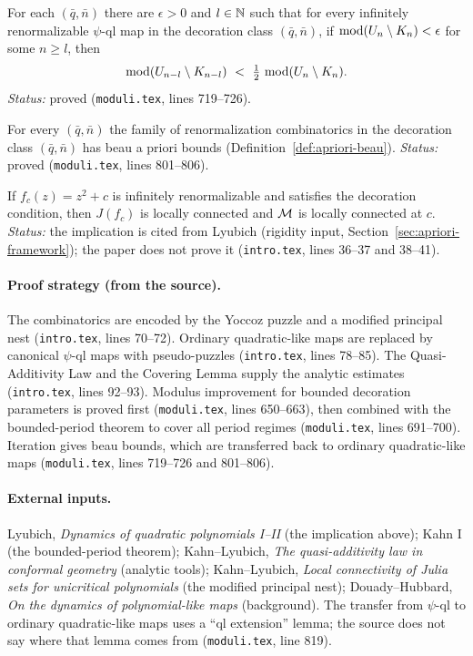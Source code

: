 \begin{theorem}
\label{thm:kahn-II-decay}
For each $(\bar q,\bar n)$ there are $\epsilon>0$ and $l\in\mathbb N$ such that for every
infinitely renormalizable $\psi$-ql map in the decoration class $(\bar q,\bar n)$, if
$\operatorname{mod}(U_n\setminus K_n)<\epsilon$ for some $n\ge l$, then
\[
\modulus(U_{n-l}\setminus K_{n-l})\ <\ \tfrac12\,\modulus(U_n\setminus K_n).
\]
\emph{Status:} proved (\texttt{moduli.tex}, lines 719--726).
\end{theorem}

\begin{theorem}
\label{thm:kahn-II-beau}
For every $(\bar q,\bar n)$ the family of renormalization combinatorics in the decoration class
$(\bar q,\bar n)$ has beau a priori bounds (Definition~\ref{def:apriori-beau}).
\emph{Status:} proved (\texttt{moduli.tex}, lines 801--806).
\end{theorem}

\begin{theorem}
\label{thm:kahn-II-mlc}
If $f_c(z)=z^2+c$ is infinitely renormalizable and satisfies the decoration condition, then
$J(f_c)$ is locally connected and $\mathcal M$ is locally connected at $c$.
\emph{Status:} the implication is cited from Lyubich (rigidity input,
Section~\ref{sec:apriori-framework}); the paper does not prove it
(\texttt{intro.tex}, lines 36--37 and 38--41).
\end{theorem}

\paragraph{Proof strategy (from the source).}
The combinatorics are encoded by the Yoccoz puzzle and a modified principal nest
(\texttt{intro.tex}, lines 70--72).  Ordinary quadratic-like maps are replaced by canonical
$\psi$-ql maps with pseudo-puzzles (\texttt{intro.tex}, lines 78--85).  The Quasi-Additivity Law
and the Covering Lemma supply the analytic estimates (\texttt{intro.tex}, lines 92--93).
Modulus improvement for bounded decoration parameters is proved first
(\texttt{moduli.tex}, lines 650--663), then combined with the bounded-period theorem to cover all
period regimes (\texttt{moduli.tex}, lines 691--700).  Iteration gives beau bounds, which are
transferred back to ordinary quadratic-like maps (\texttt{moduli.tex}, lines 719--726 and 801--806).

\paragraph{External inputs.}
Lyubich, \emph{Dynamics of quadratic polynomials I--II} (the implication above); Kahn I (the
bounded-period theorem); Kahn--Lyubich, \emph{The quasi-additivity law in conformal geometry}
(analytic tools); Kahn--Lyubich, \emph{Local connectivity of Julia sets for unicritical
polynomials} (the modified principal nest); Douady--Hubbard, \emph{On the dynamics of
polynomial-like maps} (background).  The transfer from $\psi$-ql to ordinary quadratic-like
maps uses a ``ql extension'' lemma; the source does not say where that lemma comes from
(\texttt{moduli.tex}, line 819).

